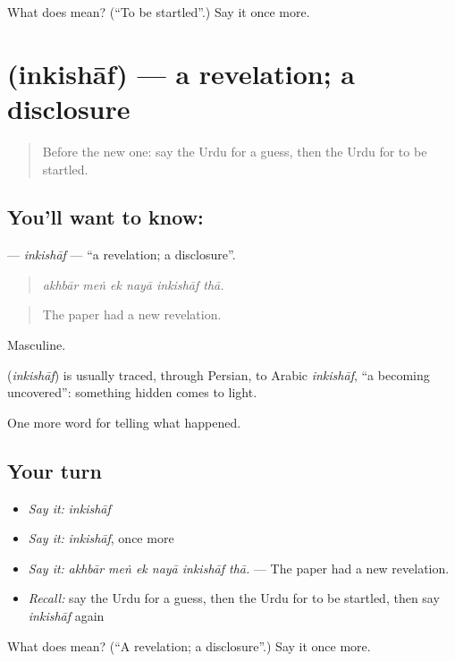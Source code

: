 \begin{tcolorbox}[breakable,colback=teal!4,colframe=teal!35!black,title={Before you move on}]
What does  mean? (\textquotedblleft{}To be startled\textquotedblright{}.) Say it once more.
\end{tcolorbox}
\section[\texorpdfstring{\ur{انکشاف} (inkishāf)}{انکشاف (inkishāf)}]{ (inkishāf) — a revelation; a disclosure}

\label{lesson:UR-C305-inkishaf}



\begin{quote}
Before the new one: say the Urdu for a guess, then the Urdu for to be startled.
\end{quote}

\subsection*{You'll want to know: }
\textbf{} — \emph{inkishāf} — \textquotedblleft{}a revelation; a disclosure\textquotedblright{}.

\begin{quote}
     
\end{quote}

\begin{quote}
\emph{akhbār meṅ ek nayā inkishāf thā.}
\end{quote}

\begin{quote}
The paper had a new revelation.
\end{quote}

Masculine.

\begin{cousinweb}
\textbf{} (\emph{inkishāf}) is usually traced, through Persian, to Arabic \emph{inkishāf}, \textquotedblleft{}a becoming uncovered\textquotedblright{}: something hidden comes to light.
\end{cousinweb}

\begin{grammarlens}[title={What you've built}]
One more word for telling what happened.
\end{grammarlens}

\subsection*{Your turn}
\begin{itemize}
\raggedright
  \item \emph{Say it:} \emph{inkishāf}
  \item \emph{Say it:} \emph{inkishāf}, once more
  \item \emph{Say it:} \emph{akhbār meṅ ek nayā inkishāf thā.} — The paper had a new revelation.
  \item \emph{Recall:} say the Urdu for a guess, then the Urdu for to be startled, then say \emph{inkishāf} again
\end{itemize}

\begin{tcolorbox}[breakable,colback=teal!4,colframe=teal!35!black,title={Before you move on}]
What does  mean? (\textquotedblleft{}A revelation; a disclosure\textquotedblright{}.) Say it once more.
\end{tcolorbox}
